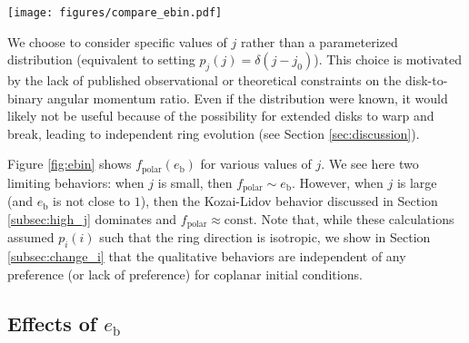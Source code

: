 \documentclass[twocolumn]{aastex631}
\begin{document}
\begin{figure*}[!htbp]
    \begin{centering}
        \texttt{[image: figures/compare\_ebin.pdf]}
        \caption{
            Polar fraction as a function of $e_{\rm b}$ for various values of $j$. Each line is computed via a numerical integration of equation (\ref{eq:prob_polar}), assuming an isotropic distribution of $i$.
            In the low-$j$ regime the polar fraction is a strong function of $e_{\rm b}$. However, as $j$ increases, $f_{\rm polar}$ becomes insensitive to the binary eccentricity (except for the case that $e_\text{b}\approx 1$). Note that $f_\text{polar}(e_\text{b}\approx 0)$ is maximized when $j=0.5$.
        }
        \label{fig:ebin}
    \end{centering}
\end{figure*}

We choose to consider specific values of $j$ rather than a parameterized distribution (equivalent to setting $p_j(j) = \delta(j-j_0)$). This choice is motivated by the lack of published observational or theoretical constraints on the disk-to-binary angular momentum ratio. Even if the distribution were known, it would likely not be useful because of the possibility for extended disks to warp and break, leading to independent ring evolution (see Section \ref{sec:discussion}).

Figure \ref{fig:ebin} shows $f_\text{polar}(e_\text{b})$ for various values of $j$. We see here two limiting behaviors: when $j$ is small, then $f_\text{polar}\sim e_\text{b}$. However, when $j$ is large (and $e_\text{b}$ is not close to $1$), then the Kozai-Lidov behavior discussed in Section \ref{subsec:high_j} dominates and $f_\text{polar}\approx \text{const}$. Note that, while these calculations assumed $p_i(i)$ such that the ring direction is isotropic, we show in Section \ref{subsec:change_i} that the qualitative behaviors are independent of any preference (or lack of preference) for coplanar initial conditions.

\subsection{Effects of $e_\text{b}$}
\label{subsec:effect-eb}
\end{document}

